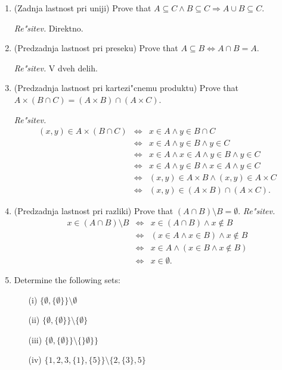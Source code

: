 \documentclass[11pt,paper=b5,footinclude,headinclude]{scrbook} %
\begin{document}
\begin{enumerate}
\item (Zadnja lastnost pri uniji) Prove that $A\subseteq C  \wedge B\subseteq C \Rightarrow A\cup B\subseteq C$.

\emph{ Re"sitev.} Direktno.

\item (Predzadnja lastnost pri preseku) Prove that $A\subseteq  B \Leftrightarrow A\cap B = A$.

\emph{ Re"sitev.} V dveh delih.

\item (Predzadnja lastnost pri kartezi"cnemu produktu) Prove that $A\times (B\cap C) = (A\times B)\cap (A\times C)$.

\emph{ Re"sitev.} 
\begin{eqnarray*}
(x,y)\in A\times (B\cap C) &\Leftrightarrow & x \in A \wedge y\in B\cap C\\
&\Leftrightarrow & x \in A \wedge y\in B  \wedge y\in C\\
&\Leftrightarrow & x \in A \wedge x \in A\wedge y\in B  \wedge y\in C\\
&\Leftrightarrow & x \in A \wedge  y\in B  \wedge x \in A\wedge y\in C\\
&\Leftrightarrow & (x,y) \in A\times B \wedge  (x,y) \in A\times C\\
&\Leftrightarrow & (x,y) \in (A\times B)\cap   (A\times C).
\end{eqnarray*}

\item (Predzadnja lastnost pri razliki) Prove that $(A\cap B )\setminus B = \emptyset$.
\emph{ Re"sitev.} 
\begin{eqnarray*}
x\in (A\cap B )\setminus B  &\Leftrightarrow & x \in (A\cap B)  \wedge x\notin B\\
&\Leftrightarrow & (x\in A\wedge x\in  B ) \wedge x\notin B\\
&\Leftrightarrow & x\in A\wedge (x\in  B  \wedge x\notin B)\\
&\Leftrightarrow & x\in \emptyset.
\end{eqnarray*}

\item Determine the following sets:
\begin{enumerate}
\item[(i)] $\{\emptyset, \{\emptyset\}\}\setminus \emptyset$ \quad [$\{\emptyset, \{\emptyset\}\}$]
\item[(ii)] $\{\emptyset, \{\emptyset\}\}\setminus \{\emptyset\}$
\item[(iii)] $\{\emptyset, \{\emptyset\}\}\setminus \{\}\emptyset\}\}$
\item[(iv)] $\{1,2,3,\{1\}, \{5\}  \}\setminus \{2,\{3\},5\}$
\end{enumerate}


\end{enumerate}
\end{document}
